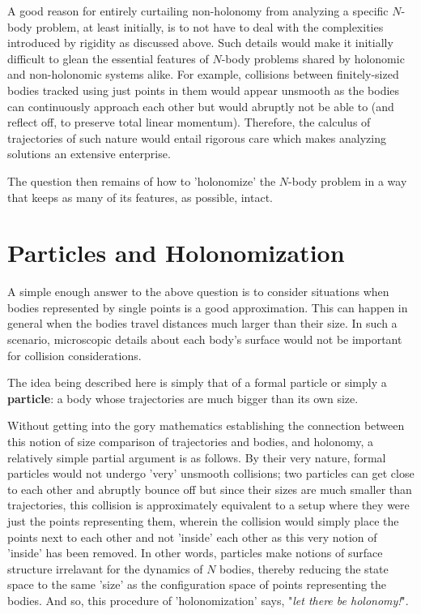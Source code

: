 \documentclass[oneside]{book}
\begin{document}
A good reason for entirely curtailing non-holonomy from analyzing a specific $N$-body problem, at least initially, is to not have to deal with the complexities introduced by rigidity as discussed above. Such details would make it initially difficult to glean the essential features of $N$-body problems shared by holonomic and non-holonomic systems alike. For example, collisions between finitely-sized bodies tracked using just points in them would appear unsmooth as the bodies can continuously approach each other but would abruptly not be able to (and reflect off, to preserve total linear momentum). Therefore, the calculus of trajectories of such nature would entail rigorous care which makes analyzing solutions an extensive enterprise.

The question then remains of how to 'holonomize' the $N$-body problem in a way that keeps as many of its features, as possible, intact.

\newpage
\section{Particles and Holonomization}

A simple enough answer to the above question is to consider situations when bodies represented by single points is a good approximation. This can happen in general when the bodies travel distances much larger than their size. In such a scenario, microscopic details about each body's surface would not be important for collision considerations.

The idea being described here is simply that of a formal particle or simply a \textbf{particle}: a body whose trajectories are much bigger than its own size. 


Without getting into the gory mathematics establishing the connection between this notion of size comparison of trajectories and bodies, and holonomy, a relatively simple partial argument is as follows. By their very nature, formal particles would not undergo 'very' unsmooth collisions; two particles can get close to each other and abruptly bounce off but since their sizes are much smaller than trajectories, this collision is approximately equivalent to a setup where they were just the points representing them, wherein the collision would simply place the points next to each other and not 'inside' each other as this very notion of 'inside' has been removed. In other words, particles make notions of surface structure irrelavant for the dynamics of $N$ bodies, thereby reducing the state space to the same 'size' as the configuration space of points representing the bodies. And so, this procedure of 'holonomization' says, "\textit{let there be holonomy!}".
\end{document}
